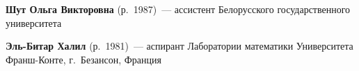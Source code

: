 \begin{multicols}{2}
\vspace*{10pt} 

 \noindent
\textbf{Шут Ольга Викторовна} (р.\ 1987)~---
 ассистент Белорусского государственного университета

\vspace*{10pt}

 \noindent
\textbf{Эль-Битар Халил} (р.\ 1981)~---
аспирант 
Лаборатории математики Университета Франш-Кон\-те, г.~Безансон, Франция

 \label{end\stat}






\end{multicols}

\newpage